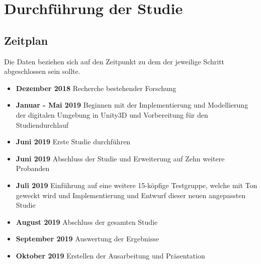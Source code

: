 \chapter{Durchführung der Studie}

\section{Zeitplan}
Die Daten beziehen sich auf den Zeitpunkt zu dem der jeweilige Schritt abgeschlossen sein sollte.
\begin{itemize}
    \item \textbf{Dezember 2018} Recherche bestehender Forschung
    \item \textbf{Januar - Mai 2019} Beginnen mit der Implementierung und Modellierung der digitalen Umgebung in Unity3D und Vorbereitung für den Studiendurchlauf
    \item \textbf{Juni 2019} Erste Studie durchführen
    \item \textbf{Juni 2019} Abschluss der Studie und Erweiterung auf Zehn weitere Probanden
    \item \textbf{Juli 2019} Einführung auf eine weitere 15-köpfige Testgruppe, welche mit Ton geweckt wird und Implementierung und Entwurf dieser neuen angepassten Studie
    \item \textbf{August 2019} Abschluss der gesamten Studie
    \item \textbf{September 2019} Auswertung der Ergebnisse
    \item \textbf{Oktober 2019} Erstellen der Ausarbeitung und Präsentation
\end{itemize}
